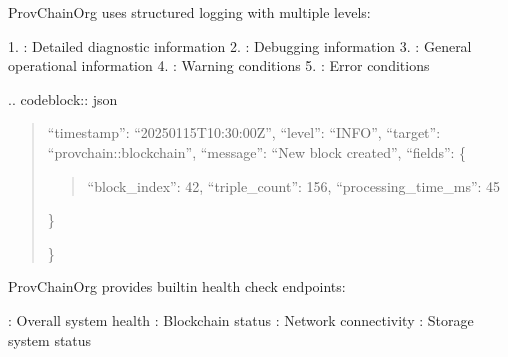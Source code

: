 \documentclass[letterpaper,10pt,english]{sphinxmanual}
\begin{document}
\sphinxAtStartPar
{}
ProvChainOrg uses structured logging with multiple levels:

\sphinxAtStartPar
{}
1. : Detailed diagnostic information
2. : Debugging information
3. : General operational information
4. : Warning conditions
5. : Error conditions

\sphinxAtStartPar
{}
.. code\sphinxhyphen{}block:: json
\begin{quote}
\begin{description}
\sphinxlineitem{\{}
\sphinxAtStartPar
“timestamp”: “2025\sphinxhyphen{}01\sphinxhyphen{}15T10:30:00Z”,
“level”: “INFO”,
“target”: “provchain::blockchain”,
“message”: “New block created”,
“fields”: \{
\begin{quote}

\sphinxAtStartPar
“block\_index”: 42,
“triple\_count”: 156,
“processing\_time\_ms”: 45
\end{quote}

\sphinxAtStartPar
\}

\end{description}

\sphinxAtStartPar
\}
\end{quote}

\sphinxAtStartPar
{}
ProvChainOrg provides built\sphinxhyphen{}in health check endpoints:

\sphinxAtStartPar
{}
\sphinxhyphen{} : Overall system health
\sphinxhyphen{} : Blockchain status
\sphinxhyphen{} : Network connectivity
\sphinxhyphen{} : Storage system status
\end{document}
